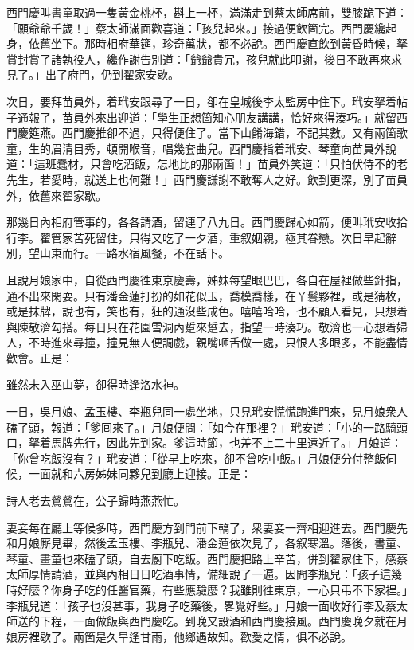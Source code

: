 西門慶叫書童取過一隻黃金桃杯，斟上一杯，滿滿走到蔡太師席前，雙膝跪下道：「願爺爺千歲！」蔡太師滿面歡喜道：「孩兒起來。」接過便飲箇完。西門慶纔起身，依舊坐下。那時相府華筵，珍奇萬狀，都不必說。西門慶直飲到黃昏時候，拏賞封賞了諸執役人，纔作謝告別道：「爺爺貴冗，孩兒就此叩謝，後日不敢再來求見了。」出了府門，仍到翟家安歇。

次日，要拜苗員外，着玳安跟尋了一日，卻在皇城後李太監房中住下。玳安拏着帖子通報了，苗員外來出迎道：「學生正想箇知心朋友講講，恰好來得湊巧。」就留西門慶筵燕。西門慶推卻不過，只得便住了。當下山餚海錯，不記其數。又有兩箇歌童，生的眉清目秀，頓開喉音，唱幾套曲兒。西門慶指着玳安、琴童向苗員外說道：「這班蠢材，只會吃酒飯，怎地比的那兩箇！」苗員外笑道：「只怕伏侍不的老先生，若愛時，就送上也何難！」西門慶謙謝不敢奪人之好。飲到更深，別了苗員外，依舊來翟家歇。

那幾日內相府管事的，各各請酒，留連了八九日。西門慶歸心如箭，便叫玳安收拾行李。翟管家苦死留住，只得又吃了一夕酒，重叙姻親，極其眷戀。次日早起辭別，望山東而行。一路水宿風餐，不在話下。

且說月娘家中，自從西門慶徃東京慶壽，姊妹每望眼巴巴，各自在屋裡做些針指，通不出來閑耍。只有潘金蓮打扮的如花似玉，喬模喬樣，在丫鬟夥裡，或是猜枚，或是抹牌，說也有，笑也有，狂的通沒些成色。嘻嘻哈哈，也不顧人看見，只想着與陳敬濟勾搭。每日只在花園雪洞內踅來踅去，指望一時湊巧。敬濟也一心想着婦人，不時進來尋撞，撞見無人便調戲，親嘴咂舌做一處，只恨人多眼多，不能盡情歡會。正是：

\begin{myquote}
雖然未入巫山夢，卻得時逢洛水神。
\end{myquote}

一日，吳月娘、孟玉樓、李瓶兒同一處坐地，只見玳安慌慌跑進門來，見月娘衆人磕了頭，報道：「爹囘來了。」月娘便問：「如今在那裡？」玳安道：「小的一路騎頭口，拏着馬牌先行，因此先到家。爹這時節，也差不上二十里遠近了。」月娘道：「你曾吃飯沒有？」玳安道：「從早上吃來，卻不曾吃中飯。」月娘便分付整飯伺候，一面就和六房姊妹同夥兒到廳上迎接。正是：

\begin{myquote}
詩人老去鶯鶯在，公子歸時燕燕忙。
\end{myquote}

妻妾每在廳上等候多時，西門慶方到門前下轎了，衆妻妾一齊相迎進去。西門慶先和月娘厮見畢，然後孟玉樓、李瓶兒、潘金蓮依次見了，各叙寒溫。落後，書童、琴童、畫童也來磕了頭，自去廚下吃飯。西門慶把路上辛苦，併到翟家住下，感蔡太師厚情請酒，並與內相日日吃酒事情，備細說了一遍。因問李瓶兒：「孩子這幾時好麼？你身子吃的任醫官藥，有些應驗麼？我雖則徃東京，一心只弔不下家裡。」李瓶兒道：「孩子也沒甚事，我身子吃藥後，畧覺好些。」月娘一面收好行李及蔡太師送的下程，一面做飯與西門慶吃。到晚又設酒和西門慶接風。西門慶晚夕就在月娘房裡歇了。兩箇是久旱逢甘雨，他鄉遇故知。歡愛之情，俱不必說。

